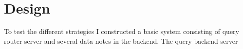 \documentclass[11pt]{article}
\begin{document}
\section{Design}

To test the different strategies I constructed a basic system consisting of query router server and  several data notes in the backend.  The query backend server 

\end{document}
